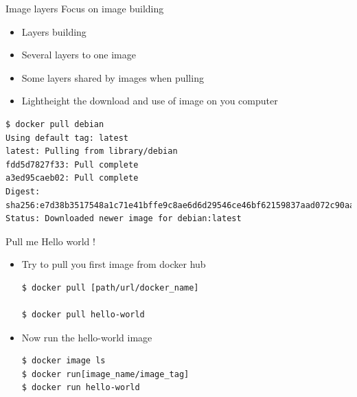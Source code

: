 \begin{frame}[fragile]{Image layers}
Focus on image building
\begin{itemize}
\item Layers building
\item Several layers to one image
\item Some layers shared by images when pulling
\item Lightheight the download and use of image on you computer
\end{itemize}
\begin{verbatim}
$ docker pull debian
Using default tag: latest
latest: Pulling from library/debian
fdd5d7827f33: Pull complete
a3ed95caeb02: Pull complete
Digest: sha256:e7d38b3517548a1c71e41bffe9c8ae6d6d29546ce46bf62159837aad072c90aa
Status: Downloaded newer image for debian:latest
\end{verbatim}
\end{frame}

\begin{frame}[fragile]{Pull me Hello world !}
\begin{itemize}
\item Try to pull you first image from docker hub
\begin{verbatim}
$ docker pull [path/url/docker_name]

$ docker pull hello-world
\end{verbatim}
\item Now run the hello-world image
\begin{verbatim}
$ docker image ls
$ docker run[image_name/image_tag]
$ docker run hello-world
\end{verbatim}
\end{itemize}
\end{frame}

